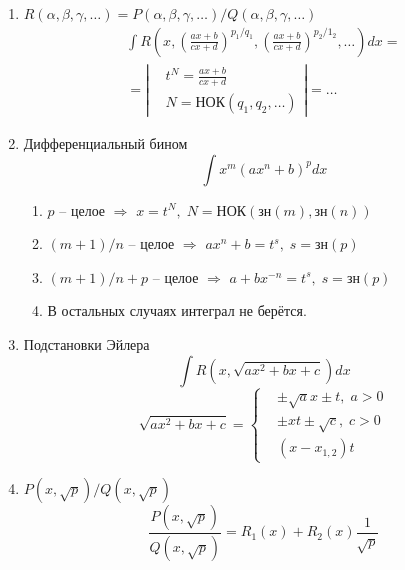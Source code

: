 \documentclass{article}
\newcommand{\x}{\text}
\begin{document}
\begin{itemize}
\begin{enumerate}
              \item $R(\alpha,\beta, \gamma,\ldots) = {P(\alpha, \beta, \gamma, \ldots)}/{Q(\alpha, \beta, \gamma, \ldots)} $
                    \begin{multline*}
                        \int R\left(x, \left(\frac{ax + b}{cx+d}\right)^{p_1/q_1}, \left(\frac{ax + b}{cx+ d}\right)^{p_2/1_2}, \ldots \right)dx = \\ = \left|
                        \begin{aligned}
                             & t^N = \frac{ax+b}{cx+d}       \\
                             & N = \x{НОК}(q_1, q_2, \ldots)
                        \end{aligned} \right| = \ldots
                    \end{multline*}
              \item Дифференциальный бином
                    $$ \int x^m (ax^n+b)^pdx $$
                    \begin{enumerate}
                        \item $p$ -- целое $\Rightarrow$ $x = t^N, \; N = \x{НОК}(\x{зн}(m), \x{зн}(n))$
                        \item $(m+1)/{n}$ -- целое $\Rightarrow$ $ax^n+b = t^s, \; s=\x{зн}(p)$
                        \item ${(m+1)}/{n}+p$ -- целое $\Rightarrow$ $a + b x^{-n} = t^s, \; s=\x{зн}(p)$
                        \item В остальных случаях интеграл не берётся.
                    \end{enumerate}
              \item Подстановки Эйлера
                    $$ \int R\left(x, \sqrt{ax^2+bx+c}\right)dx $$
                    \begin{equation*}
                        \sqrt{ax^2+bx+c} = \left\{
                        \begin{aligned}
                             & \pm \sqrt{a}x \pm t, \; a > 0 \\
                             & \pm xt \pm \sqrt{c}, \; c > 0 \\
                             & (x-x_{1,2})t
                        \end{aligned}
                        \right.
                    \end{equation*}
              \item $P(x, \sqrt{p})/Q(x, \sqrt{p})$
                    $$ \frac{P(x, \sqrt{p})}{Q(x, \sqrt{p})} = R_1(x) + R_2(x) \frac{1}{\sqrt{p}} $$

\end{enumerate}
\end{itemize}
\end{document}
